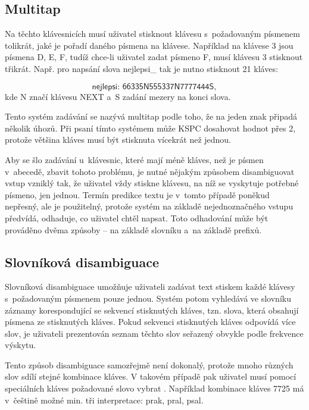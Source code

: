 \documentclass[a4paper,11pt,openany]{book} %
\newcommand\exmp{\textsf}
\begin{document}
\subsection{Multitap}

Na těchto klávesnicích musí uživatel stisknout klávesu s~požadovaným písmenem tolikrát, jaké je pořadí daného písmena na klávese. Například na klávese \exmp{3} jsou písmena \exmp{D}, \exmp{E}, \exmp{F}, tudíž chce-li uživatel zadat písmeno \exmp{F}, musí klávesu \exmp{3} stisknout třikrát. Např. pro napsání slova \exmp{nejlepsi\_} tak je nutno stisknout 21 kláves:

\[
	\exmp{nejlepsi: 66335N555337N7777444S},
\]
kde \exmp{N} značí klávesu \exmp{NEXT} a~\exmp{S} zadání mezery na konci slova.

Tento systém zadávání se nazývá multitap podle toho, že na jeden znak připadá několik úhozů. Při psaní tímto systémem může KSPC dosahovat hodnot přes 2, protože většina kláves musí být stisknuta vícekrát než jednou. \parencite[202]{mackenzie2002kspc}

Aby se šlo zadávání u~klávesnic, které mají méně kláves, než je písmen v~abecedě, zbavit tohoto problému, je nutné nějakým způsobem disambiguovat vstup vzniklý tak, že uživatel vždy stiskne klávesu, na níž se vyskytuje potřebné písmeno, jen jednou. Termín predikce textu je v~tomto případě poněkud nepřesný, ale je použitelný, protože systém na základě nejednoznačného vstupu předvídá, odhaduje, co uživatel chtěl napsat. Toto odhadování může být prováděno dvěma způsoby -- na základě slovníku a~na základě prefixů.

\subsection{Slovníková disambiguace}

Slovníková disambiguace umožňuje uživateli zadávat text stiskem každé klávesy s~požadovaným písmenem pouze jednou. Systém potom vyhledává ve slovníku záznamy korespondující se sekvencí stisknutých kláves, tzn. slova, která obsahují písmena ze stisknutých kláves. Pokud sekvenci stisknutých kláves odpovídá více slov, je uživateli prezentován seznam těchto slov seřazený obvykle podle frekvence výskytu. %

Tento způsob disambiguace samozřejmě není dokonalý, protože mnoho různých slov sdílí stejné kombinace kláves. V takovém případě pak uživatel musí pomocí speciálních kláves požadované slovo vybrat \parencite{MacKenzie2001}. Například kombinace kláves \exmp{7725} má v~češtině možné min. tři interpretace: \exmp{prak, pral, psal}.
\end{document}
